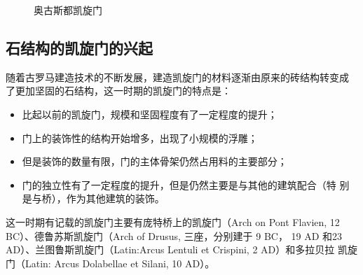 \documentclass[a4paper,dvipdfm]{article}
\begin{document}
\begin{figure}[hbt!]
  \centering
  \caption{奥古斯都凯旋门}
\end{figure}

\clearpage

\subsection{石结构的凯旋门的兴起}

随着古罗马建造技术的不断发展，建造凯旋门的材料逐渐由原来的砖结构转变成
了更加坚固的石结构，这一时期的凯旋门的特点是：

\begin{itemize}
\item 比起以前的凯旋门，规模和坚固程度有了一定程度的提升；
\item 门上的装饰性的结构开始增多，出现了小规模的浮雕；
\item 但是装饰的数量有限，门的主体骨架仍然占用料的主要部分；
\item 门的独立性有了一定程度的提升，但是仍然主要是与其他的建筑配合（特
  别是与桥），作为其他建筑的装饰。
\end{itemize}

这一时期有记载的凯旋门主要有庞特桥上的凯旋门（Arch on Pont Flavien, 12
BC）、德鲁苏斯凯旋门（Arch of Drusus, 三座，分别建于 9 BC， 19 AD 和23
AD）、兰图鲁斯凯旋门（Latin:Arcus Lentuli et Crispini, 2 AD）和多拉贝拉
凯旋门（Latin: Arcus Dolabellae et Silani, 10 AD）。
\end{document}
